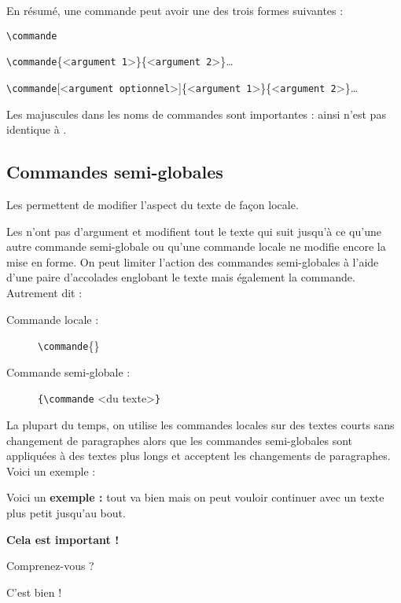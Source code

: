 En résumé, une commande peut avoir une des trois formes suivantes :

	\verb!\commande! \par
	\verb!\commande!\{<\verb!argument 1!>\}\{<\verb!argument 2!>\}\dots\par
	\verb!\commande![<\verb!argument optionnel!>]\{<\verb!argument 1!>\}\{<\verb!argument 2!>\}\dots


\begin{info}
    Les majuscules dans les noms de commandes sont importantes : ainsi  n'est pas identique à .
\end{info}

\subsection{Commandes semi-globales}

Les  permettent de modifier l'aspect du texte de façon locale.\par
Les  n'ont pas d'argument et modifient tout le texte qui suit jusqu'à ce qu'une autre commande semi-globale ou qu'une commande locale ne modifie encore la mise en forme. On peut limiter l'action des commandes semi-globales à l'aide d'une paire d'accolades englobant le texte mais également la commande. Autrement dit :
\begin{description}
    \item[Commande locale :] \verb!\commande!\{<du texte>\}
    \item[Commande semi-globale :] \verb!{!\verb!\commande! <du texte>\verb!}!
\end{description}

La plupart du temps, on utilise les commandes locales sur des textes courts sans changement de paragraphes alors que les commandes semi-globales sont appliquées à des textes plus longs et acceptent les changements de paragraphes. Voici un exemple :\bigskip

\begin{SideBySideExample}
    Voici un \textbf{exemple :}
    tout va bien mais on peut vouloir
    continuer avec un texte
    \tiny plus petit jusqu'au bout.\par
    {\bfseries
        Cela est important !\par
        Comprenez-vous ?
    }
    C'est bien !
\end{SideBySideExample}


